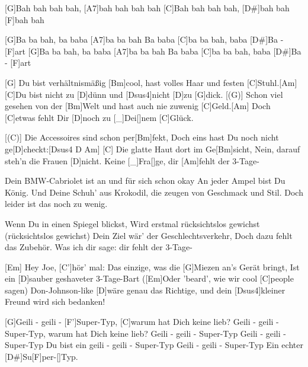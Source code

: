 

\begin{guitar}
	[G]Bah bah bah bah, [A7]bah bah bah bah
	[C]Bah bah bah bah, [D#]bah bah [F]bah bah
	
	[G]Ba ba bah, ba baba [A7]ba ba bah
	Ba baba [C]ba ba bah, baba [D#]Ba - [F]art
	[G]Ba ba bah, ba baba [A7]ba ba bah
	Ba baba [C]ba ba bah, baba [D#]Ba - [F]art
	
	[G] Du bist verhältnismäßig [Bm]cool, hast volles Haar und festen [C]Stuhl.[Am]{}
	[C]Du bist nicht zu [D]dünn und [{\color{gray}Dsus4}]nicht [{\color{gray}D}]zu [G]dick.
	[(G)] Schon viel gesehen von der [Bm]Welt und hast auch nie zuwenig [C]Geld.[Am]{}
	Doch [C]etwas fehlt Dir [D]noch zu [_]{Dei}[]nem [C]Glück.
	
	[(C)] Die Accessoires sind schon per[Bm]fekt, 
	Doch eins hast Du noch nicht ge[D]checkt:[{\color{gray}Dsus4 D}  Am]{}
	[C] Die glatte Haut dort im Ge[Bm]sicht, 
	Nein, darauf steh'n die Frauen [D]nicht. Keine [_]{Fra}[]ge, dir [Am]fehlt der 3-Tage-
	
	 
	
	Dein BMW-Cabriolet ist an und für sich schon okay
	An jeder Ampel bist Du König.
	Und Deine Schuh' aus Krokodil, die zeugen von Geschmack und Stil.
	Doch leider ist das noch zu wenig.
	
	\pagebreak
	Wenn Du in einen Spiegel blickst,
	Wird erstmal rücksichtslos gewichst (rücksichtslos gewichst)
	Dein Ziel wär' der Geschlechtsverkehr,
	Doch dazu fehlt das Zubehör. Was ich dir sage: dir fehlt der 3-Tage-
	
	 
	
	[Em] Hey Joe, [C']hör' mal:
	Das einzige, was die [G]Miezen an's Gerät bringt,
	Ist ein [D]sauber geshaveter 3-Tage-Bart
	([Em]Oder 'beard', wie wir cool [C]people sagen)
	Don-Johnson-like [D]wäre genau das Richtige, 
	und dein [Dsus4]kleiner Freund wird sich bedanken!
	
	[G]Geili - geili - [F']Super-Typ, [C]warum hat Dich keine lieb?
	Geili - geili - Super-Typ, warum hat Dich keine lieb?
	Geili - geili - Super-Typ
	Geili - geili - Super-Typ
	Du bist ein geili - geili - Super-Typ
	Geili - geili - Super-Typ
	Ein echter [D#]Su[F]per-[]Typ.
	
\end{guitar}